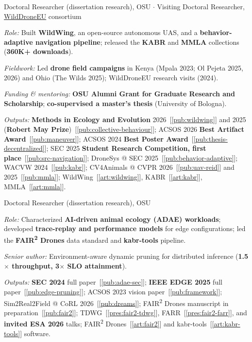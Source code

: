 {%
{Doctoral Researcher (dissertation research), OSU $\cdot$ Visiting Doctoral Researcher, \href{https://wilddrone.eu/}{WildDroneEU} consortium}%
\begin{pbullets}
  \item \textit{Role:} Built \textbf{WildWing}, an open-source autonomous UAS, and a \textbf{behavior-adaptive navigation pipeline}; released the \textbf{KABR} and \textbf{MMLA} collections (\textbf{360K+ downloads}).
  \item \textit{Fieldwork:} Led \textbf{drone field campaigns} in Kenya (Mpala 2023; Ol Pejeta 2025, 2026) and Ohio (The Wilds 2025); WildDroneEU research visits (2024).
  \item \textit{Funding \& mentoring:} \textbf{OSU Alumni Grant for Graduate Research and Scholarship}; \textbf{co-supervised a master's thesis} (University of Bologna).
  \item \textit{Outputs:} \textbf{Methods in Ecology and Evolution} 2026~[\ref{pub:wildwing}] and 2025 (\textbf{Robert May Prize})~[\ref{pub:collective-behaviour}]; ACSOS 2026 \textbf{Best Artifact Award}~[\ref{pub:maneuver}]; ACSOS 2024 \textbf{Best Poster Award}~[\ref{pub:thesis-decentralized}]; SEC 2025 \textbf{Student Research Competition, first place}~[\ref{pub:src-navigation}]; DroneSys @ SEC 2025~[\ref{pub:behavior-adaptive}]; WACVW 2024~[\ref{pub:kabr}]; CV4Animals @ CVPR 2026~[\ref{pub:uav-reid}] and 2025~[\ref{pub:mmla}]; WildWing~[\ref{art:wildwing}], KABR~[\ref{art:kabr}], MMLA~[\ref{art:mmla}].
\end{pbullets}
\vspace{4pt}

%
{Doctoral Researcher (dissertation research), OSU}%
\begin{pbullets}
  \item \textit{Role:} Characterized \textbf{AI-driven animal ecology (ADAE) workloads}; developed \textbf{trace-replay and performance models} for edge configurations; led the \textbf{FAIR\textsuperscript{2} Drones} data standard and \textbf{kabr-tools} pipeline.
  \item \textit{Senior author:} Environment-aware dynamic pruning for distributed inference (\textbf{1.5$\times$ throughput, 3$\times$ SLO attainment}).
  \item \textit{Outputs:} \textbf{SEC 2024} full paper~[\ref{pub:adae-sec}]; \textbf{IEEE EDGE 2025} full paper~[\ref{pub:edge-pruning}]; ACSOS 2023 vision paper~[\ref{pub:framework}]; Sim2Real2Field @ CoRL 2026~[\ref{pub:dreams}]; FAIR\textsuperscript{2} Drones manuscript in preparation~[\ref{pub:fair2}]; TDWG~[\ref{pres:fair2-tdwg}], FARR~[\ref{pres:fair2-farr}], and \textbf{invited ESA 2026} talks; FAIR\textsuperscript{2} Drones~[\ref{art:fair2}] and kabr-tools~[\ref{art:kabr-tools}] software.
\end{pbullets}
\vspace{4pt}

}
